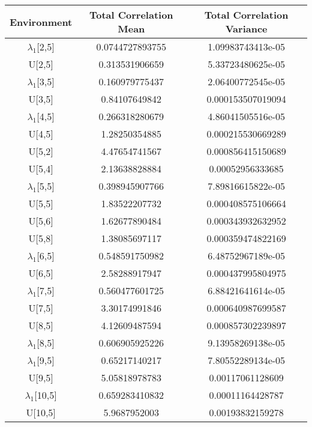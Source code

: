 \begin{table}[ht!]
\begin{tabular}{|c|c|c|}
\hline
Environment & Total Correlation Mean& Total Correlation Variance\\
\hline
\hline
$\lambda_{1}$[2,5] &0.0744727893755&1.09983743413e-05\\
U[2,5] &0.313531906659&5.33723480625e-05\\
$\lambda_{1}$[3,5] &0.160979775437&2.06400772545e-05\\
U[3,5] &0.84107649842&0.000153507019094\\
$\lambda_{1}$[4,5] &0.266318280679&4.86041505516e-05\\
U[4,5] &1.28250354885&0.000215530669289\\
U[5,2] &4.47654741567&0.000856415150689\\
U[5,4] &2.13638828884&0.00052956333685\\
$\lambda_{1}$[5,5] &0.398945907766&7.89816615822e-05\\
U[5,5] &1.83522207732&0.000408575106664\\
U[5,6] &1.62677890484&0.000343932632952\\
U[5,8] &1.38085697117&0.000359474822169\\
$\lambda_{1}$[6,5] &0.548591750982&6.48752967189e-05\\
U[6,5] &2.58288917947&0.000437995804975\\
$\lambda_{1}$[7,5] &0.560477601725&6.88421641614e-05\\
U[7,5] &3.30174991846&0.000640987699587\\
U[8,5] &4.12609487594&0.000857302239897\\
$\lambda_{1}$[8,5] &0.606905925226&9.13958269138e-05\\
$\lambda_{1}$[9,5] &0.65217140217&7.80552289134e-05\\
U[9,5] &5.05818978783&0.00117061128609\\
$\lambda_{1}$[10,5] &0.659283410832&0.00011164428787\\
U[10,5] &5.9687952003&0.00193832159278\\
\hline
\end{tabular}
\end{table}
